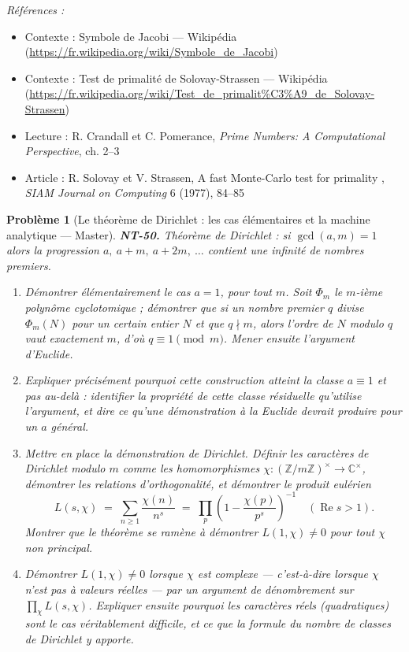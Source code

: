 \documentclass[11pt]{article}
\newtheorem{problem}{Problème}
\newenvironment{refs}{\par\small\noindent\emph{Références :}\begin{itemize}\setlength\itemsep{0pt}}{\end{itemize}\normalsize}
\begin{document}
\begin{refs}
\item Contexte : Symbole de Jacobi --- Wikipédia (\url{https://fr.wikipedia.org/wiki/Symbole_de_Jacobi})
\item Contexte : Test de primalité de Solovay-Strassen --- Wikipédia (\url{https://fr.wikipedia.org/wiki/Test_de_primalit%C3%A9_de_Solovay-Strassen})
\item Lecture : R. Crandall et C. Pomerance, \textit{Prime Numbers: A Computational Perspective}, ch. 2--3
\item Article : R. Solovay et V. Strassen, \og{} A fast Monte-Carlo test for primality \fg{}, \textit{SIAM Journal on Computing} 6 (1977), 84--85
\end{refs}

\bigskip

\begin{problem}[{Le théorème de Dirichlet : les cas élémentaires et la machine analytique --- Master}]
\textbf{NT-50.} Théorème de Dirichlet : si $ \gcd(a, m) = 1 $ alors la progression
$ a,\ a+m,\ a+2m,\ \ldots $ contient une infinité de nombres premiers.
\begin{enumerate}
\item[(a)] Démontrer élémentairement le cas $ a = 1 $, pour tout $ m $. Soit $ \Phi_m $ le
$ m $-ième polynôme cyclotomique ; démontrer que si un nombre premier $ q $ divise
$ \Phi_m(N) $ pour un certain entier $ N $ et que $ q \nmid m $, alors l'ordre de $ N $
modulo $ q $ vaut exactement $ m $, d'où $ q \equiv 1 \pmod m $. Mener ensuite l'argument
d'Euclide.
\item[(b)] Expliquer précisément pourquoi cette construction atteint la classe $ a \equiv 1 $ et pas
au-delà : identifier la propriété de cette classe résiduelle qu'utilise l'argument, et dire ce
qu'une démonstration à la Euclide devrait produire pour un $ a $ général.
\item[(c)] Mettre en place la démonstration de Dirichlet. Définir les caractères de Dirichlet modulo
$ m $ comme les homomorphismes
$ \chi : (\mathbb{Z}/m\mathbb{Z})^{\times} \to \mathbb{C}^{\times} $, démontrer les relations
d'orthogonalité, et démontrer le produit eulérien
\[ L(s, \chi) \;=\; \sum_{n \ge 1} \frac{\chi(n)}{n^{s}} \;=\; \prod_{p} \left( 1 - \frac{\chi(p)}{p^{s}} \right)^{-1} \quad (\operatorname{Re} s > 1). \]
Montrer que le théorème se ramène à démontrer $ L(1, \chi) \ne 0 $ pour tout $ \chi $ non
principal.
\item[(d)] Démontrer $ L(1,\chi) \ne 0 $ lorsque $ \chi $ est complexe --- c'est-à-dire lorsque $ \chi $
n'est pas à valeurs réelles --- par un argument de dénombrement sur $ \prod_\chi L(s,\chi) $.
Expliquer ensuite pourquoi les caractères réels (quadratiques) sont le cas véritablement difficile,
et ce que la formule du nombre de classes de Dirichlet y apporte.
\end{enumerate}

\end{problem}
\end{document}
